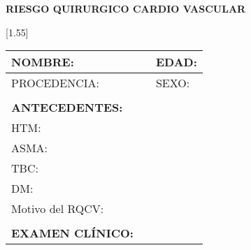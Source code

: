 \documentclass[10pt,a4paper]{article}
\begin{document}
 
\begin{center}
\begin{large}
\textbf{RIESGO QUIRURGICO CARDIO VASCULAR}
\end{large}
\scalebox{1.40}[1.55]{
\begin{tabular}{|p{2.8cm}p{2.8cm}p{2.8cm}p{2.8cm}|} 
\hline 

\multicolumn{2}{|l}{\begin{minipage}[t]{5.5 cm}\scriptsize{NOMBRE: }\end{minipage}}&\multicolumn{2}{l|}{\begin{minipage}[t]{5.5 cm}\scriptsize{EDAD: }\end{minipage}}\\
\hline
\multicolumn{2}{|l}{\begin{minipage}[t]{5.5 cm}\scriptsize{PROCEDENCIA: }\end{minipage}}&\multicolumn{2}{l|}{\begin{minipage}[t]{5.5 cm}\scriptsize{SEXO: }\end{minipage}}\\
\hline
\multicolumn{1}{l}{\scriptsize{}}&&& \multicolumn{1}{l}{ \scriptsize{}}\\
\multicolumn{1}{l}{\scriptsize{\textbf{ANTECEDENTES:}}}&&& \multicolumn{1}{l}{ \scriptsize{}}\\
\hline 
\multicolumn{4}{|l|}{\begin{minipage}[t]{12.5 cm}\scriptsize{HTM: }\end{minipage}}\\
\hline
\multicolumn{4}{|l|}{\begin{minipage}[t]{12.5 cm}\scriptsize{ASMA: }\end{minipage}}\\
\hline
\multicolumn{4}{|l|}{\begin{minipage}[t]{12.5 cm}\scriptsize{TBC: }\end{minipage}}\\
\hline
\multicolumn{4}{|l|}{\begin{minipage}[t]{12.5 cm}\scriptsize{DM: }\end{minipage}}\\
\hline
\multicolumn{4}{|l|}{\begin{minipage}[t]{12.5 cm}\scriptsize{Motivo del RQCV: }\end{minipage}}\\
\hline
\multicolumn{1}{l}{\scriptsize{}}&&& \multicolumn{1}{l}{ \scriptsize{}}\\
\multicolumn{1}{l}{\scriptsize{\textbf{EXAMEN CL\'INICO: }}}&&& \multicolumn{1}{l}{ \scriptsize{}}\\

\end{tabular}}
\end{center}
\end{document}
